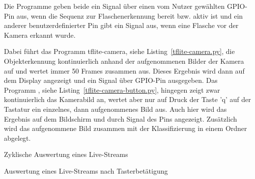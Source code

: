 Die Programme geben beide ein Signal über einen vom Nutzer gewählten GPIO-Pin aus, wenn die Sequenz zur Flaschenerkennung bereit bzw. aktiv ist und ein anderer benutzerdefinierter Pin gibt ein Signal aus, wenn eine Flasche vor der Kamera erkannt wurde.

Dabei führt das Programm tflite-camera, siehe Listing~\ref{tflite-camera.py}, die Objekterkennung kontinuierlich anhand der aufgenommenen Bilder der Kamera auf und wertet immer 50 Frames zusammen aus. Dieses Ergebnis wird dann  auf dem Display angezeigt und ein Signal über GPIO-Pin ausgegeben. Das Programm , siehe Listing~\ref{tflite-camera-button.py}, hingegen zeigt zwar kontinuierlich das Kamerabild an, wertet aber nur auf Druck der Taste 'q' auf der Tastatur ein einzelnes, dann aufgenommenes Bild aus. Auch hier wird das Ergebnis auf dem Bildschirm und durch Signal des Pins angezeigt. Zusätzlich wird das aufgenommene Bild zusammen mit der Klassifizierung in einem Ordner abgelegt.

\begin{code}
  
  \caption{Zyklische Auswertung eines Live-Streams}\label{tflite-camera.py}
\end{code}

  
\begin{code}

  \caption{Auswertung eines Live-Streams nach Tasterbetätigung}\label{tflite-camera-button.py}
\end{code}
